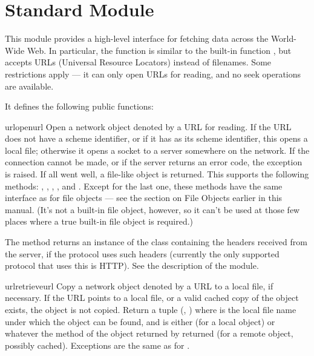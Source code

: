 \section{Standard Module }
\label{module-urllib}


This module provides a high-level interface for fetching data across
the World-Wide Web.  In particular, the  function is
similar to the built-in function , but accepts URLs
(Universal Resource Locators) instead of filenames.  Some restrictions
apply --- it can only open URLs for reading, and no seek operations
are available.

It defines the following public functions:

\begin{funcdesc}{urlopen}{url}
Open a network object denoted by a URL for reading.  If the URL does
not have a scheme identifier, or if it has  as its scheme
identifier, this opens a local file; otherwise it opens a socket to a
server somewhere on the network.  If the connection cannot be made, or
if the server returns an error code, the  exception is
raised.  If all went well, a file-like object is returned.  This
supports the following methods: , ,
, ,  and .
Except for the last one, these methods have the same interface as for
file objects --- see the section on File Objects earlier in this
manual.  (It's not a built-in file object, however, so it can't be
used at those few places where a true built-in file object is
required.)

The  method returns an instance of the class
 containing the headers received from the server,
if the protocol uses such headers (currently the only supported
protocol that uses this is HTTP).  See the description of the
 module.
\end{funcdesc}

\begin{funcdesc}{urlretrieve}{url}
Copy a network object denoted by a URL to a local file, if necessary.
If the URL points to a local file, or a valid cached copy of the
object exists, the object is not copied.  Return a tuple (,
) where  is the local file name under which
the object can be found, and  is either  (for
a local object) or whatever the  method of the object
returned by  returned (for a remote object, possibly
cached).  Exceptions are the same as for .
\end{funcdesc}

